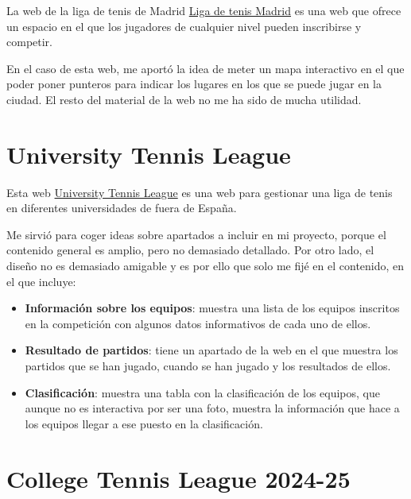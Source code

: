 La web de la liga de tenis de Madrid \href{https://www.rankingmadridcapital.com/#body}{Liga de tenis Madrid} es una web que ofrece un espacio en el que los jugadores de cualquier nivel pueden inscribirse y competir.

En el caso de esta web, me aportó la idea de meter un mapa interactivo en el que poder poner punteros para indicar los lugares en los que se puede jugar en la ciudad. El resto del material de la web no me ha sido de mucha utilidad.



\section{University Tennis League}\label{uni-tennis-league}

Esta web \href{https://www.university-tennis.com/teams}{University Tennis League} es una web para gestionar una liga de tenis en diferentes universidades de fuera de España.

Me sirvió para coger ideas sobre apartados a incluir en mi proyecto, porque el contenido general es amplio, pero no demasiado detallado. Por otro lado, el diseño no es demasiado amigable y es por ello que solo me fijé en el contenido, en el que incluye:

\begin{itemize}
    \item \textbf{Información sobre los equipos}: muestra una lista de los equipos inscritos en la competición con algunos datos informativos de cada uno de ellos.
    \item \textbf{Resultado de partidos}: tiene un apartado de la web en el que muestra los partidos que se han jugado, cuando se han jugado y los resultados de ellos.
    \item \textbf{Clasificación}: muestra una tabla con la clasificación de los equipos, que aunque no es interactiva por ser una foto, muestra la información que hace a los equipos llegar a ese puesto en la clasificación.
\end{itemize}



\section{College Tennis League 2024-25}\label{college-tennis-league}


